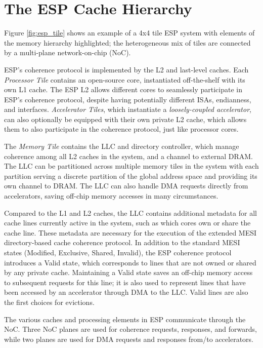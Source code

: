 \section{The ESP Cache Hierarchy}
\label{sec:cache}

Figure \ref{fig:esp_tile} shows an example of a 4x4 tile ESP system with
elements of the memory hierarchy highlighted; the heterogeneous mix of tiles are
connected by a multi-plane network-on-chip (NoC).

ESP's coherence protocol is implemented by the L2 and last-level caches.  Each
\emph{Processor Tile} contains an open-source core, instantiated off-the-shelf
with its own L1 cache. The ESP L2 allows different cores to seamlessly
participate in ESP's coherence protocol, despite having potentially different
ISAs, endianness, and interfaces.  \emph{Accelerator Tiles}, which instantiate
a \emph{loosely-coupled accelerator}, can also optionally be equipped with
their own private L2 cache, which allows them to also participate in the
coherence protocol, just like processor cores.

The \emph{Memory Tile} contains the LLC and directory controller, which manage
coherence among all L2 caches in the system, and a channel to external DRAM.
The LLC can be partitioned across multiple memory tiles in the system with each
partition serving a discrete partition of the global address space and
providing its own channel to DRAM. The LLC can also handle DMA requests
directly from accelerators, saving off-chip memory accesses in many
circumstances.

\par Compared to the L1 and L2 caches, the LLC contains additional metadata for
all cache lines currently active in the system, such as which cores own or
share the cache line. These metadata are necessary for the execution of the
extended MESI directory-based cache coherence protocol.  In addition to the
standard MESI states (Modified, Exclusive, Shared, Invalid), the ESP coherence
protocol introduces a Valid state, which corresponds to lines that are not
owned or shared by any private cache. Maintaining a Valid state saves an
off-chip memory access to subsequent requests for this line; it is also used to
represent lines that have been accessed by an accelerator through DMA to the
LLC. Valid lines are also the first choices for evictions.

The various caches and processing elements in ESP communicate through the NoC.
Three NoC planes are used for coherence requests, responses, and forwards,
while two planes are used for DMA requests and responses from/to accelerators.

